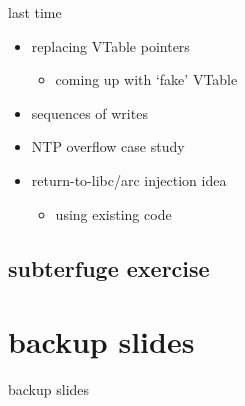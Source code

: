 \date{}
\title{}
\date{}

\begin{frame}
    \titlepage
\end{frame}



\begin{frame}{last time}
    \begin{itemize}
    \item replacing VTable pointers
        \begin{itemize}
        \item coming up with `fake' VTable
        \end{itemize}
    \item sequences of writes
    \item NTP overflow case study
    \item return-to-libc/arc injection idea
        \begin{itemize}
        \item using existing code
        \end{itemize}
    \end{itemize}
\end{frame}

\subsection{subterfuge exercise}







\section{backup slides}
\begin{frame}{backup slides}
\end{frame}


